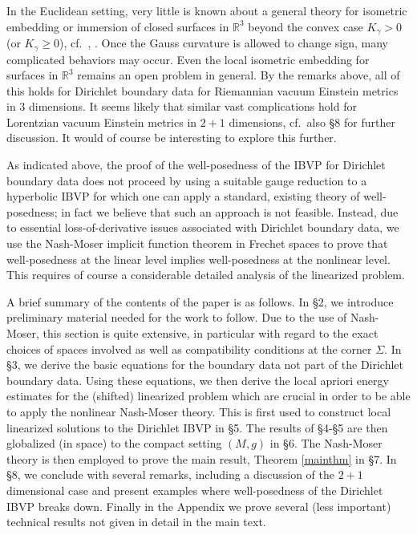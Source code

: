 \documentclass[10pt]{amsart}
\newcommand{\g}{\gamma}
\newcommand{\Si}{\Sigma}
\newcommand{\bR}{\mathbb R}
\newcommand{\<}{\langle}
\renewcommand{\>}{\rangle}
\theoremstyle{plain}
\theoremstyle{remark}
\theoremstyle{definition}
\numberwithin{equation}{section}
\begin{document}
  In the Euclidean setting, very little is known about a general theory for isometric embedding or immersion of closed surfaces in $\bR^3$ 
beyond the convex case $K_{\g} > 0$ (or $K_{\g} \geq 0$), cf.~\cite{HH}, \cite{Sp}. Once the Gauss curvature is allowed to change sign, many complicated 
behaviors may occur. Even the local isometric embedding for surfaces in $\bR^3$ remains an open problem in general. By the remarks above, all 
of this holds for Dirichlet boundary data for Riemannian vacuum Einstein metrics in $3$ dimensions. It seems likely that similar vast complications hold for 
Lorentzian vacuum Einstein metrics in $2+1$ dimensions, cf.~also \S 8 for further discussion. It would of course be interesting to explore this further. 
  
\medskip 

  As indicated above, the proof of the well-posedness of the IBVP for Dirichlet boundary data does not proceed by using a suitable gauge reduction to 
a hyperbolic IBVP for which one can apply a standard, existing theory of well-posedness; in fact we believe that such an approach is not feasible. Instead, 
due to essential loss-of-derivative issues associated with Dirichlet boundary data, we use the Nash-Moser implicit function theorem in Frechet spaces 
to prove that well-posedness at the linear level implies well-posedness at the nonlinear level. This requires of course a considerable detailed analysis of the 
linearized problem. 

\medskip 

  A brief summary of the contents of the paper is as follows. In \S 2, we introduce preliminary material needed for the work to follow. Due to the use of 
Nash-Moser, this section is quite extensive, in particular with regard to the exact choices of spaces involved as well as compatibility conditions at the 
corner $\Si$. In \S 3, we derive the basic equations for the boundary data not part of the Dirichlet boundary data. Using these equations, we 
then derive the local apriori energy estimates for the (shifted) linearized problem which are crucial in order to be able to apply the nonlinear Nash-Moser theory. 
This is first used to construct local linearized solutions to the Dirichlet IBVP in \S 5. The results of \S 4-\S 5 are then globalized (in space) to the compact 
setting $(M, g)$ in \S 6. The Nash-Moser theory is then employed to prove the main result, Theorem \ref{mainthm} in \S 7. In \S 8, we conclude with 
several remarks, including a discussion of the $2+1$ dimensional case and present examples where well-posedness of the Dirichlet IBVP breaks down. 
Finally in the Appendix we prove several (less important) technical results not given in detail in the main text. 
\end{document}
